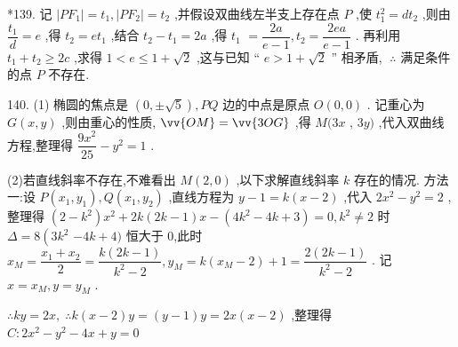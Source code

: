 *139. 记 $\left| {P{F}_{1}}\right|  = {t}_{1},\left| {P{F}_{2}}\right|  = {t}_{2}$ ,并假设双曲线左半支上存在点 $P$ ,使 ${t}_{1}^{2} = d{t}_{2}$ ,则由 $\dfrac{{t}_{1}}{d} = e$ ,得 ${t}_{2} = e{t}_{1}$ ,结合 ${t}_{2} - {t}_{1} = {2a}$ ,得 ${t}_{1}$  $= \dfrac{2a}{e - 1},{t}_{2} = \dfrac{2ea}{e - 1}$ . 再利用 ${t}_{1} + {t}_{2} \geq  {2c}$ ,求得 $1 < e \leq  1 + \sqrt{2}$ ,这与已知 “ $e > 1 + \sqrt{2}$ ” 相矛盾, $\;\therefore$ 满足条件的点 $P$ 不存在.

140. (1) 椭圆的焦点是 $\left( {0, \pm  \sqrt{5}}\right) ,{PQ}$ 边的中点是原点 $O\left( {0,0}\right)$ . 记重心为 $G\left( {x,y}\right)$ ,则由重心的性质, $\vv{OM} = \vv{3OG}$ ,得 $M({3x}$ , ${3y})$ ,代入双曲线方程,整理得 $\dfrac{9{x}^{2}}{25} - {y}^{2} = 1$ .

(2)若直线斜率不存在,不难看出 $M\left( {2,0}\right)$ ,以下求解直线斜率 $k$ 存在的情况. 方法一:设 $P\left( {{x}_{1},{y}_{1}}\right) ,Q\left( {{x}_{1},{y}_{2}}\right)$ ,直线方程为 $y - 1 = k\left( {x - 2}\right)$ ,代入 $2{x}^{2} - {y}^{2} = 2$ ,整理得 $\left( {2 - {k}^{2}}\right) {x}^{2} + {2k}\left( {{2k} - 1}\right) x - \left( {4{k}^{2} - {4k} + 3}\right)  = 0,{k}^{2} \neq  2$ 时 $\Delta  = 8\left( {3{k}^{2}}\right.$  $- {4k} + 4)$ 恒大于 0,此时 ${x}_{M} = \dfrac{{x}_{1} + {x}_{2}}{2} = \dfrac{k\left( {{2k} - 1}\right) }{{k}^{2} - 2},{y}_{M} = k\left( {{x}_{M} - 2}\right)  + 1 = \dfrac{2\left( {{2k} - 1}\right) }{{k}^{2} - 2}$ . 记 $x = {x}_{M},y = {y}_{M}$ .

$\therefore {ky} = {2x},\;\therefore k\left( {x - 2}\right) y = \left( {y - 1}\right) y = {2x}\left( {x - 2}\right)$ ,整理得 $C : 2{x}^{2} - {y}^{2} - {4x} + y = 0$

